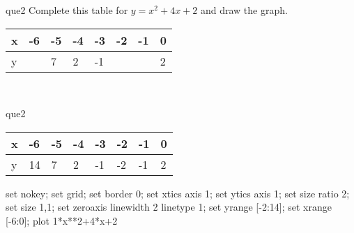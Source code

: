 \documentclass[13.5pt, varwidth=true]{beamer}
\begin{document}
\begin{frame}[shrink=19,fragile]
	\begin{beamercolorbox}[rounded=true, left, shadow=true,wd=14.8cm]{que2}
		 Complete this table for $y = x^{2} + 4x + 2$ and draw the graph. \\[0.3cm] \renewcommand{\arraystretch}{1.2}\begin{tabular}{|C|C|C|C|C|C|C|C|} \hline x & -6 & -5 & -4 & -3 & -2 & -1 & 0 \\ \hline y &  & 7 & 2 & -1 &  &  & 2\\ \hline \end{tabular}\\[0.3cm]
	\end{beamercolorbox}
\end{frame}
\begin{frame}[shrink=19,fragile]
	\begin{beamercolorbox}[rounded=true, left, shadow=true,wd=14.8cm]{que2}
		\renewcommand{\arraystretch}{1.2}\begin{tabular}{|C|C|C|C|C|C|C|C|} \hline x & -6 & -5 & -4 & -3 & -2 & -1 & 0 \\ \hline y & 14 & 7 & 2 & -1 & -2 & -1 & 2\\ \hline \end{tabular}\begin{gnuplot}[terminal=pdf] set nokey; set grid; set border 0; set xtics axis 1; set ytics axis 1; set size ratio 2; set size 1,1; set zeroaxis linewidth 2 linetype 1; set yrange [-2:14]; set xrange [-6:0]; plot 1*x**2+4*x+2 \end{gnuplot}
	\end{beamercolorbox}
\end{frame}
\end{document}
